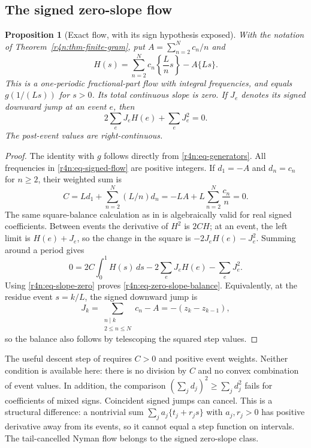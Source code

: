 \documentclass[11pt,a4paper]{article}
\newtheorem{proposition}[theorem]{Proposition}
\theoremstyle{definition}\newtheorem{definition}[theorem]{Definition}
\theoremstyle{remark}\newtheorem{remark}[theorem]{Remark}
\numberwithin{equation}{section}
\begin{document}
\subsection{The signed zero-slope flow}
\label{r4n:subsec-flow}

\begin{proposition}[Exact flow, with its sign hypothesis exposed]
\label{r4n:prop-zero-slope}
With the notation of Theorem~\ref{r4n:thm-finite-gram}, put
$A=\sum_{n=2}^Nc_n/n$ and
\begin{equation}
\label{r4n:eq-signed-flow}
 H(s)=\sum_{n=2}^Nc_n\left\{\frac Ln s\right\}-A\{Ls\}.
\end{equation}
This is a one-periodic fractional-part flow with integral frequencies,
and equals $g(1/(Ls))$ for $s>0$.
Its total continuous slope is zero.
If $J_e$ denotes its signed downward jump at an event $e$, then
\begin{equation}
\label{r4n:eq-zero-slope-balance}
 2\sum_eJ_eH(e)+\sum_eJ_e^2=0.
\end{equation}
The post-event values are right-continuous.
\end{proposition}

\begin{proof}
The identity with $g$ follows directly from
\eqref{r4n:eq-generators}.  All frequencies in
\eqref{r4n:eq-signed-flow} are positive integers.
If $d_1=-A$ and $d_n=c_n$ for $n\ge2$, their weighted sum is
\begin{equation}
\label{r4n:eq-slope-zero}
 C=Ld_1+\sum_{n=2}^N(L/n)d_n
   =-LA+L\sum_{n=2}^N\frac{c_n}{n}=0.
\end{equation}
The same square-balance calculation as in \cite{VMRC200} is
algebraically valid for real signed coefficients.
Between events the derivative of $H^2$ is $2CH$; at an event,
the left limit is $H(e)+J_e$, so the change in the square is
$-2J_eH(e)-J_e^2$.
Summing around a period gives
\[
 0=2C\int_0^1H(s)\,ds-2\sum_eJ_eH(e)-\sum_eJ_e^2.
\]
Using \eqref{r4n:eq-slope-zero} proves
\eqref{r4n:eq-zero-slope-balance}.
Equivalently, at the residue event $s=k/L$, the signed downward
jump is
\[
 J_k=\sum_{\substack{n\mid k\\2\le n\le N}}c_n-A
     =-(z_k-z_{k-1}),
\]
so the balance also follows by telescoping the squared step values.
\end{proof}

The useful descent step of \cite{VMRC200} requires $C>0$ and
positive event weights.  Neither condition is available here:
there is no division by $C$ and no convex combination of event
values.  In addition, the comparison
$(\sum_jd_j)^2\ge\sum_jd_j^2$ fails for coefficients of mixed signs.
Coincident signed jumps can cancel.
This is a structural difference: a nontrivial sum
$\sum_ja_j\{t_j+r_js\}$ with $a_j,r_j>0$ has positive derivative
away from its events, so it cannot equal a step function on intervals.
The tail-cancelled Nyman flow belongs to the signed zero-slope class.
\end{document}
